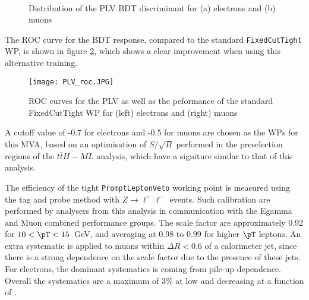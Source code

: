 \begin{figure}[H]
\begin{center}
    \\
    \label{fig:PLV_score}
    \caption{Distribution of the PLV BDT discriminant for (a) electrons and (b) muons}
\end{center}
\end{figure}

The ROC curve for the BDT response, compared to the standard \verb!FixedCutTight! WP, is shown in figure \ref{fig:PLV_roc}, which shows a clear improvement when using this alternative training.

\begin{figure}[H]
\begin{center}
    \texttt{[image: PLV\_roc.JPG]}
    \label{fig:PLV_roc}
    \caption{ROC curves for the PLV as well as the peformance of the standard FixedCutTight WP for (left) electrons and (right) muons}
\end{center}
\end{figure}

A cutoff value of -0.7 for electrons and -0.5 for muons are chosen as the WPs for this MVA, based on an optimisation of $S/\sqrt{B}$ performed in the preselection regions of the $t\bar{t}H-ML$ analysis, which have a signiture similar to that of this analysis.

The efficiency of the tight \texttt{PromptLeptonVeto} working point is measured using the tag and probe method with $Z\rightarrow \ell^{+}\ell^{-}$ events. Such calibration are performed by analysers from this analysis in communication with the Egamma and Muon combined performance groups. The scale factor are approximately 0.92 for $10 < \pT < 15$~GeV, and averaging at 0.98 to 0.99 for higher $\pT$ leptons. An extra systematic is applied to muons within $\Delta R < 0.6$ of a calorimeter jet, since there is a strong dependence on the scale factor due to the presence of these jets. For electrons, the dominant systematics  is coming from pile-up dependence. Overall the systematics are a maximum of 3\% at low \pT and decreasing at a function of \pT.
